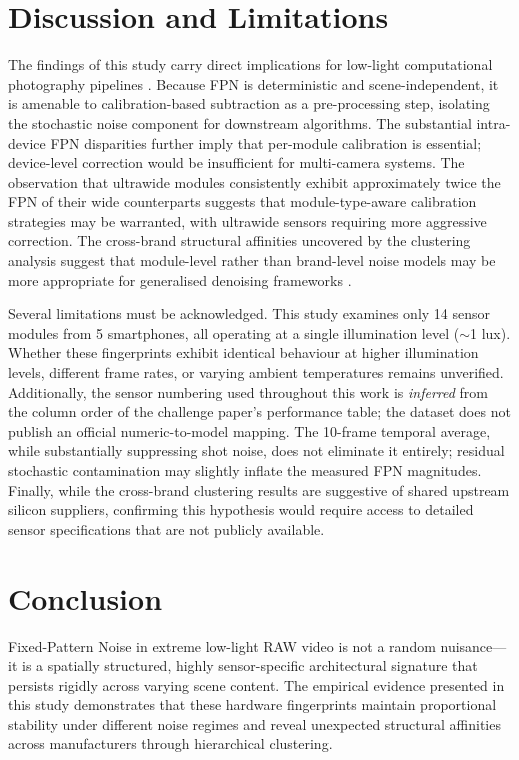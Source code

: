 \documentclass[conference]{IEEEtran}
\begin{document}
\section{Discussion and Limitations}

The findings of this study carry direct implications for low-light computational photography pipelines \cite{chen2018learning, hasinoff2016burst, fu2023low}. Because FPN is deterministic and scene-independent, it is amenable to calibration-based subtraction as a pre-processing step, isolating the stochastic noise component for downstream algorithms. The substantial intra-device FPN disparities further imply that per-module calibration is essential; device-level correction would be insufficient for multi-camera systems. The observation that ultrawide modules consistently exhibit approximately twice the FPN of their wide counterparts suggests that module-type-aware calibration strategies may be warranted, with ultrawide sensors requiring more aggressive correction. The cross-brand structural affinities uncovered by the clustering analysis suggest that module-level rather than brand-level noise models may be more appropriate for generalised denoising frameworks \cite{zhang2021rethinking, abdelhamed2018high}.

Several limitations must be acknowledged. This study examines only 14 sensor modules from 5 smartphones, all operating at a single illumination level ($\sim$1 lux). Whether these fingerprints exhibit identical behaviour at higher illumination levels, different frame rates, or varying ambient temperatures remains unverified. Additionally, the sensor numbering used throughout this work is \textit{inferred} from the column order of the challenge paper's performance table; the dataset does not publish an official numeric-to-model mapping. The 10-frame temporal average, while substantially suppressing shot noise, does not eliminate it entirely; residual stochastic contamination may slightly inflate the measured FPN magnitudes. Finally, while the cross-brand clustering results are suggestive of shared upstream silicon suppliers, confirming this hypothesis would require access to detailed sensor specifications that are not publicly available.

\section{Conclusion}

Fixed-Pattern Noise in extreme low-light RAW video is not a random nuisance---it is a spatially structured, highly sensor-specific architectural signature that persists rigidly across varying scene content. The empirical evidence presented in this study demonstrates that these hardware fingerprints maintain proportional stability under different noise regimes and reveal unexpected structural affinities across manufacturers through hierarchical clustering.
\end{document}
